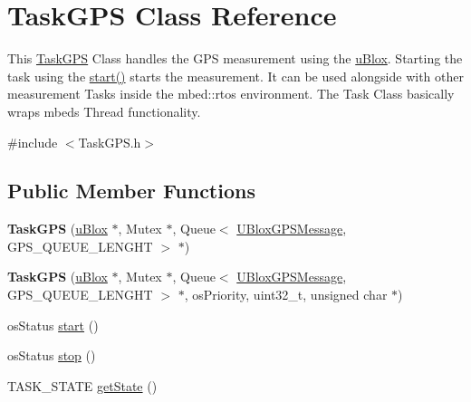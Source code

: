 \hypertarget{class_task_g_p_s}{}\section{Task\+G\+P\+S Class Reference}
\label{class_task_g_p_s}


This \hyperlink{class_task_g_p_s}{Task\+G\+P\+S} Class handles the G\+P\+S measurement using the \hyperlink{classu_blox}{u\+Blox}. Starting the task using the \hyperlink{class_task_g_p_s_af0c070a139c754f802ae456a350aa1db}{start()} starts the measurement. It can be used alongside with other measurement Tasks inside the mbed\+::rtos environment. The Task Class basically wraps mbeds Thread functionality.  




{\ttfamily \#include $<$Task\+G\+P\+S.\+h$>$}

\subsection*{Public Member Functions}
\begin{DoxyCompactItemize}
\item 
\hypertarget{class_task_g_p_s_af319c228440c12e1f0cace3f4fab8b6d}{}{\bfseries Task\+G\+P\+S} (\hyperlink{classu_blox}{u\+Blox} $\ast$, Mutex $\ast$, Queue$<$ \hyperlink{class_u_blox_g_p_s_message}{U\+Blox\+G\+P\+S\+Message}, G\+P\+S\+\_\+\+Q\+U\+E\+U\+E\+\_\+\+L\+E\+N\+G\+H\+T $>$ $\ast$)\label{class_task_g_p_s_af319c228440c12e1f0cace3f4fab8b6d}

\item 
\hypertarget{class_task_g_p_s_a44c8b0ea07f08dddf4b4592e7d561cb8}{}{\bfseries Task\+G\+P\+S} (\hyperlink{classu_blox}{u\+Blox} $\ast$, Mutex $\ast$, Queue$<$ \hyperlink{class_u_blox_g_p_s_message}{U\+Blox\+G\+P\+S\+Message}, G\+P\+S\+\_\+\+Q\+U\+E\+U\+E\+\_\+\+L\+E\+N\+G\+H\+T $>$ $\ast$, os\+Priority, uint32\+\_\+t, unsigned char $\ast$)\label{class_task_g_p_s_a44c8b0ea07f08dddf4b4592e7d561cb8}

\item 
os\+Status \hyperlink{class_task_g_p_s_af0c070a139c754f802ae456a350aa1db}{start} ()
\item 
os\+Status \hyperlink{class_task_g_p_s_aa03b804ce54372f9afcc24d52cd11b0c}{stop} ()
\item 
T\+A\+S\+K\+\_\+\+S\+T\+A\+T\+E \hyperlink{class_task_g_p_s_a16f42723c4a17b4b27d1d27b6e012845}{get\+State} ()
\end{DoxyCompactItemize}



